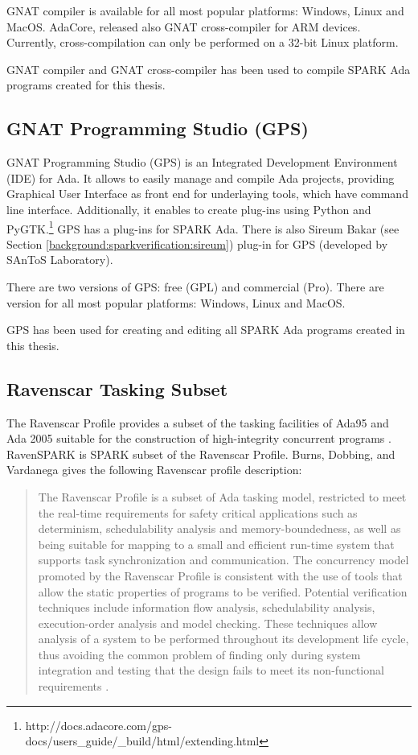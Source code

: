 GNAT compiler is available for all most popular platforms: Windows, Linux and MacOS. AdaCore, released also GNAT cross-compiler for ARM devices. Currently, cross-compilation can only be performed on a 32-bit Linux platform.

GNAT compiler and GNAT cross-compiler has been used to compile SPARK Ada programs created for this thesis.



\subsection{GNAT Programming Studio (GPS)}
\label{background:spark:gps}

GNAT Programming Studio (GPS) is an Integrated Development Environment (IDE) for Ada. It allows to easily manage and compile Ada projects, providing Graphical User Interface as front end for underlaying tools, which have command line interface. Additionally, it enables to create plug-ins using Python and PyGTK.\footnote{http://docs.adacore.com/gps-docs/users\_guide/\_build/html/extending.html} GPS has a plug-ins for SPARK Ada. There is also Sireum Bakar (see Section \ref{background:sparkverification:sireum}) plug-in for GPS (developed by SAnToS Laboratory).

There are two versions of GPS: free (GPL) and commercial (Pro). There are version for all most popular platforms: Windows, Linux and MacOS.

GPS has been used for creating and editing all SPARK Ada programs created in this thesis.



\subsection{Ravenscar Tasking Subset}
\label{background:spark:ravenscar}

The Ravenscar Profile provides a subset of the tasking facilities of Ada95 and Ada 2005 suitable for the construction of high-integrity concurrent programs \cite{Ravenscar:Online}. RavenSPARK is SPARK subset of the Ravenscar Profile. Burns, Dobbing, and Vardanega gives the following Ravenscar profile description:
\begin{quote}
The Ravenscar Profile is a subset of Ada tasking model, restricted to meet the real-time requirements for safety critical applications such as determinism, schedulability analysis and memory-boundedness, as well as being suitable for mapping to a small and efficient run-time system that supports task synchronization and communication. The concurrency model promoted by the Ravenscar Profile is consistent with the use of tools that allow the static properties of programs to be verified. Potential verification techniques include information flow analysis, schedulability analysis, execution-order analysis and model checking. These techniques allow analysis of a system to be performed throughout its development life cycle, thus avoiding the common problem of finding only during system integration and testing that the design fails to meet its non-functional requirements \cite{Ravenscar:Article}. 
\end{quote}

